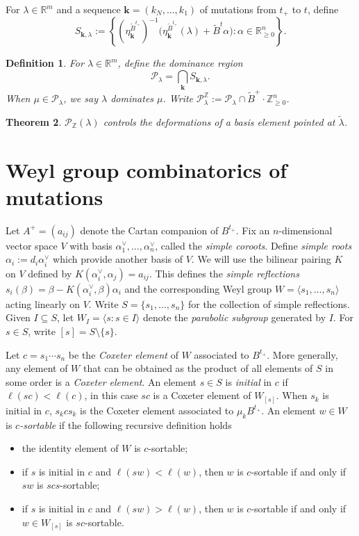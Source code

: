 \documentclass{amsart}
\newtheorem{theorem}{Theorem}
\newtheorem{definition}[theorem]{Definition}
\numberwithin{theorem}{section}
\newcommand{\bfk}{{\boldsymbol{k}}}
\newcommand{\cP}{\mathcal{P}}
\newcommand{\RR}{\mathbb{R}}
\newcommand{\ZZ}{\mathbb{Z}}
\begin{document}
  For $\lambda\in\RR^m$ and a sequence $\bfk=(k_N,\ldots,k_1)$ of mutations from $t_+$ to $t$, define 
  \[S_{\bfk,\lambda}:=\left\{\left(\eta^{\widetilde B^{t_+}}_\bfk\right)^{-1}\big(\eta^{\widetilde B^{t_+}}_\bfk(\lambda)+\widetilde B^t\alpha\big):\alpha\in\RR^n_{\ge0}\right\}.\]
  
  \begin{definition}
    For $\lambda\in\RR^m$, define the \emph{dominance region} 
    \[
      \cP_\lambda = \bigcap_\bfk S_{\bfk,\lambda}.
    \]
    When $\mu\in\cP_\lambda$, we say \emph{$\lambda$ dominates $\mu$}.
    Write $\cP_\lambda^\ZZ:=\cP_\lambda\cap \widetilde B^+ \cdot \ZZ_{\ge0}^n$. 
  \end{definition}

  \begin{theorem}
    \cite{qin}
    $\cP_\ZZ(\lambda)$ controls the deformations of a basis element pointed at $\widetilde\lambda$.
  \end{theorem}


  \section{Weyl group combinatorics of mutations}
  Let $A^+=(a_{ij})$ denote the Cartan companion of $B^{t_+}$.
  Fix an $n$-dimensional vector space $V$ with basis $\alpha^\vee_1,\ldots,\alpha^\vee_n$, called the \emph{simple coroots}.
  Define \emph{simple roots} $\alpha_i:=d_i\alpha^\vee_i$ which provide another basis of $V$.
  We will use the bilinear pairing $K$ on $V$ defined by $K(\alpha^\vee_i,\alpha_j)=a_{ij}$.
  This defines the \emph{simple reflections} $s_i(\beta)=\beta-K(\alpha^\vee_i,\beta)\alpha_i$ and the corresponding Weyl group $W=\langle s_1,\ldots,s_n\rangle$ acting linearly on $V$.
  Write $S=\{s_1,\ldots,s_n\}$ for the collection of simple reflections.
  Given $I\subseteq S$, let $W_I=\langle s:s\in I\rangle$ denote the \emph{parabolic subgroup} generated by $I$.
  For $s\in S$, write $[s]=S\setminus\{s\}$.

  Let $c=s_1\cdots s_n$ be the \emph{Coxeter element} of $W$ associated to $B^{t_+}$.
  More generally, any element of $W$ that can be obtained as the product of all elements of $S$ in some order is a \emph{Coxeter element}.
  An element $s\in S$ is \emph{initial} in $c$ if $\ell(sc)<\ell(c)$, in this case $sc$ is a Coxeter element of $W_{[s]}$.
  When $s_k$ is initial in $c$, $s_k c s_k$ is the Coxeter element associated to $\mu_k B^{t_+}$.
  An element $w\in W$ is \emph{$c$-sortable} if the following recursive definition holds
  \begin{itemize}
    \item the identity element of $W$ is $c$-sortable;
    \item if $s$ is initial in $c$ and $\ell(sw)<\ell(w)$, then $w$ is $c$-sortable if and only if $sw$ is $scs$-sortable;
    \item if $s$ is initial in $c$ and $\ell(sw)>\ell(w)$, then $w$ is $c$-sortable if and only if $w\in W_{[s]}$ is $sc$-sortable.
  \end{itemize}
\end{document}
